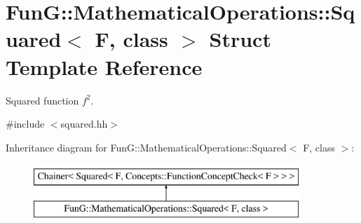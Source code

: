 \hypertarget{structFunG_1_1MathematicalOperations_1_1Squared}{}\section{FunG\+:\+:Mathematical\+Operations\+:\+:Squared$<$ F, class $>$ Struct Template Reference}
\label{structFunG_1_1MathematicalOperations_1_1Squared}


Squared function $f^2$.  




{\ttfamily \#include $<$squared.\+hh$>$}

Inheritance diagram for FunG\+:\+:Mathematical\+Operations\+:\+:Squared$<$ F, class $>$\+:\begin{figure}[H]
\begin{center}
\leavevmode
\includegraphics[height=2.000000cm]{structFunG_1_1MathematicalOperations_1_1Squared}
\end{center}
\end{figure}
